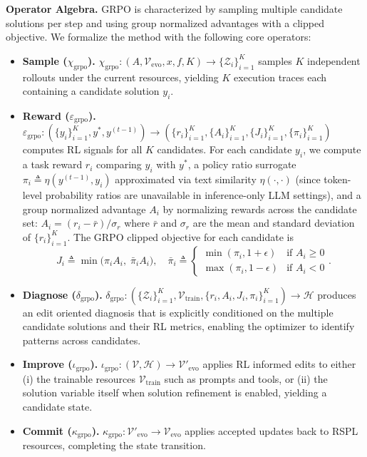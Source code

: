 \textbf{Operator Algebra.}
GRPO is characterized by sampling multiple candidate solutions per step and using group normalized advantages with a clipped objective. We formalize the method with the following core operators:
\begin{itemize}[leftmargin=1em, itemsep=0em, parsep=0em, topsep=0em, partopsep=0em]
  \item \textbf{Sample ($\chi_{\mathrm{grpo}}$).} $\chi_{\mathrm{grpo}}: (A, \mathcal{V}_{\text{evo}}, x, f, K) \rightarrow \{\mathcal{Z}_i\}_{i=1}^K$ samples $K$ independent rollouts under the current resources, yielding $K$ execution traces each containing a candidate solution $y_i$.
  \item \textbf{Reward ($\varepsilon_{\mathrm{grpo}}$).} $\varepsilon_{\mathrm{grpo}}: (\{y_i\}_{i=1}^K, y^{*}, y^{(t-1)}) \rightarrow (\{r_i\}_{i=1}^K, \{A_i\}_{i=1}^K, \{J_i\}_{i=1}^K, \{\pi_i\}_{i=1}^K)$ computes RL signals for all $K$ candidates. For each candidate $y_i$, we compute a task reward $r_i$ comparing $y_i$ with $y^{*}$, a policy ratio surrogate $\pi_i \triangleq \eta(y^{(t-1)}, y_i)$ approximated via text similarity $\eta(\cdot,\cdot)$ (since token-level probability ratios are unavailable in inference-only LLM settings), and a group normalized advantage $A_i$ by normalizing rewards across the candidate set: $A_i = (r_i - \bar{r}) / \sigma_r$ where $\bar{r}$ and $\sigma_r$ are the mean and standard deviation of $\{r_i\}_{i=1}^K$. The GRPO clipped objective for each candidate is
  \[
    J_i \triangleq \min\bigl(\pi_i A_i,\; \bar{\pi}_i A_i\bigr),
    \quad \bar{\pi}_i \triangleq \begin{cases}
      \min(\pi_i, 1+\epsilon) & \text{if } A_i \geq 0 \\
      \max(\pi_i, 1-\epsilon) & \text{if } A_i < 0
    \end{cases}.
  \]
  \item \textbf{Diagnose ($\delta_{\mathrm{grpo}}$).} $\delta_{\mathrm{grpo}}: (\{\mathcal{Z}_i\}_{i=1}^K, \mathcal{V}_{\text{train}}, \{r_i, A_i, J_i, \pi_i\}_{i=1}^K) \rightarrow \mathcal{H}$ produces an edit oriented diagnosis that is explicitly conditioned on the multiple candidate solutions and their RL metrics, enabling the optimizer to identify patterns across candidates.
  \item \textbf{Improve ($\iota_{\mathrm{grpo}}$).} $\iota_{\mathrm{grpo}}: (\mathcal{V}, \mathcal{H}) \rightarrow \mathcal{V}'_{\text{evo}}$ applies RL informed edits to either (i) the trainable resources $\mathcal{V}_{\text{train}}$ such as prompts and tools, or (ii) the solution variable itself when solution refinement is enabled, yielding a candidate state.
  \item \textbf{Commit ($\kappa_{\mathrm{grpo}}$).} $\kappa_{\mathrm{grpo}}: \mathcal{V}'_{\text{evo}} \rightarrow \mathcal{V}_{\text{evo}}$ applies accepted updates back to RSPL resources, completing the state transition.
\end{itemize}

